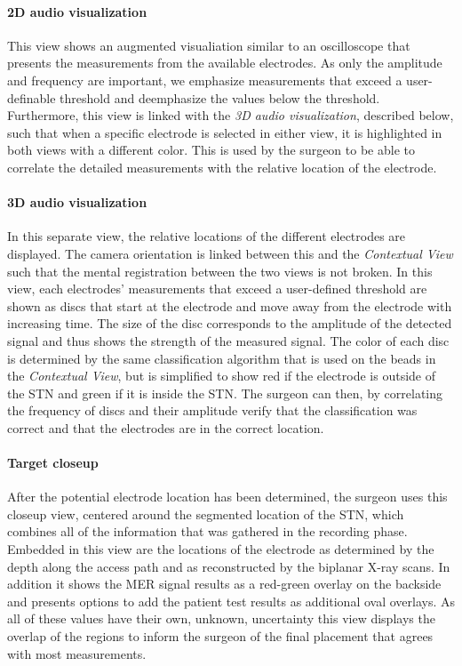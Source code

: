 \paragraph{2D audio visualization} This view shows an augmented visualiation similar to an oscilloscope that presents the measurements from the available electrodes. As only the amplitude and frequency are important, we emphasize measurements that exceed a user-definable threshold and deemphasize the values below the threshold. Furthermore, this view is linked with the \emph{3D audio visualization}, described below, such that when a specific electrode is selected in either view, it is highlighted in both views with a different color. This is used by the surgeon to be able to correlate the detailed measurements with the relative location of the electrode.

\paragraph{3D audio visualization} In this separate view, the relative locations of the different electrodes are displayed. The camera orientation is linked between this and the \emph{Contextual View} such that the mental registration between the two views is not broken. In this view, each electrodes' measurements that exceed a user-defined threshold are shown as discs that start at the electrode and move away from the electrode with increasing time. The size of the disc corresponds to the amplitude of the detected signal and thus shows the strength of the measured signal. The color of each disc is determined by the same classification algorithm that is used on the beads in the \emph{Contextual View}, but is simplified to show red if the electrode is outside of the STN and green if it is inside the STN. The surgeon can then, by correlating the frequency of discs and their amplitude verify that the classification was correct and that the electrodes are in the correct location.

\paragraph{Target closeup} After the potential electrode location has been determined, the surgeon uses this closeup view, centered around the segmented location of the STN, which combines all of the information that was gathered in the recording phase. Embedded in this view are the locations of the electrode as determined by the depth along the access path and as reconstructed by the biplanar X-ray scans. In addition it shows the MER signal results as a red-green overlay on the backside and presents options to add the patient test results as additional oval overlays. As all of these values have their own, unknown, uncertainty this view displays the overlap of the regions to inform the surgeon of the final placement that agrees with most measurements.

